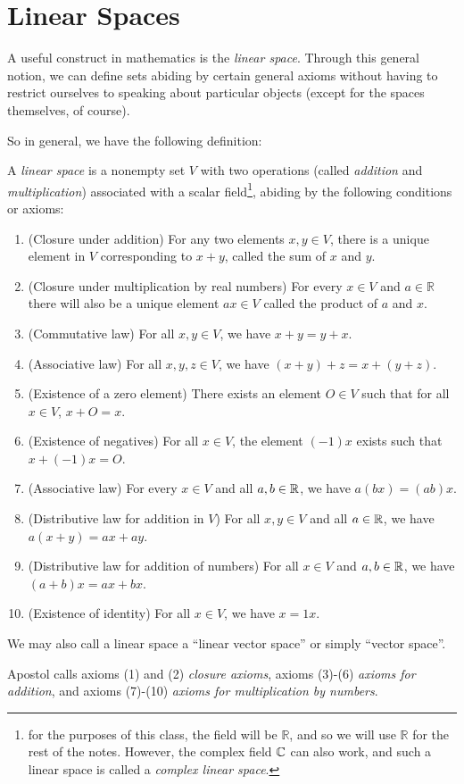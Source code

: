 \documentclass[main.tex]{subfiles}
\begin{document}
    \chapter{Linear Spaces}
    A useful construct in mathematics is the \textit{linear space}. 
    Through this general notion, we can define sets abiding by certain general axioms without having to restrict ourselves to speaking about particular objects (except for the spaces themselves, of course).

    \par So in general, we have the following definition:
    \begin{definition}
        A \textit{linear space} is a nonempty set $V$ with two operations (called \textit{addition} and \textit{multiplication}) associated with a scalar field\footnote{for the purposes of this class, the field will be $\mathbb{R}$, and so we will use $\mathbb{R}$ for the rest of the notes. However, the complex field $\mathbb{C}$ can also work, and such a linear space is called a \textit{complex linear space}.}, abiding by the following conditions or axioms:
        \begin{enumerate}
            \item (Closure under addition) For any two elements $x,y \in V$, there is a unique element in $V$ corresponding to $x+y$, called the sum of $x$ and $y$.
            \item (Closure under multiplication by real numbers) For every $x \in V$ and $a \in \mathbb{R}$ there will also be a unique element $ax \in V$ called the product of $a$ and $x$.
            \item (Commutative law) For all $x, y \in V$, we have $x+y = y+x$.
            \item (Associative law) For all $x, y, z \in V$, we have $(x+y)+z = x+(y+z)$.
            \item (Existence of a zero element) There exists an element $O \in V$ such that for all $x \in V$, $x+O = x$.
            \item (Existence of negatives) For all $x \in V$, the element $(-1)x$ exists such that $x + (-1)x = O$.
            \item (Associative law) For every $x \in V$ and all $a, b \in \mathbb{R}$, we have $a(bx) = (ab)x$.
            \item (Distributive law for addition in $V$) For all $x, y \in V$ and all $a \in \mathbb{R}$, we have $a(x+y) = ax+ay$.
            \item (Distributive law for addition of numbers) For all $x \in V$ and $a, b \in \mathbb{R}$, we have $(a+b)x = ax + bx$.
            \item (Existence of identity) For all $x\in V$, we have $x = 1x$.
        \end{enumerate}
        We may also call a linear space a ``linear vector space'' or simply ``vector space''.
    \end{definition}
    Apostol calls axioms (1) and (2) \textit{closure axioms}, axioms (3)-(6) \textit{axioms for addition}, and axioms (7)-(10) \textit{axioms for multiplication by numbers}. 
\end{document}
